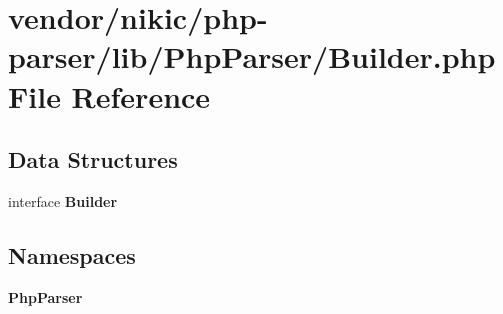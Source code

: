\section{vendor/nikic/php-\/parser/lib/\+Php\+Parser/\+Builder.php File Reference}
\label{nikic_2php-parser_2lib_2_php_parser_2_builder_8php}
\subsection*{Data Structures}
\begin{DoxyCompactItemize}
\item 
interface {\bf Builder}
\end{DoxyCompactItemize}
\subsection*{Namespaces}
\begin{DoxyCompactItemize}
\item 
 {\bf Php\+Parser}
\end{DoxyCompactItemize}
